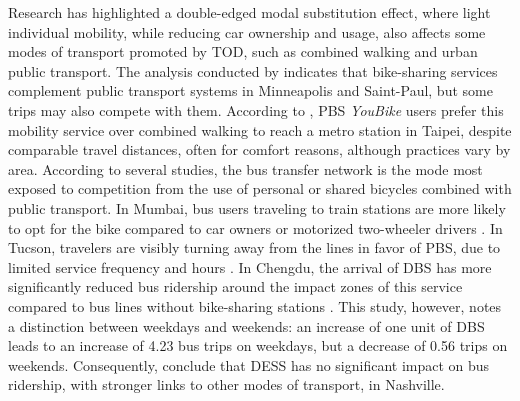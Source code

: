 \begin{refsegment}
Research has highlighted a double-edged modal substitution effect, where light individual mobility, while reducing car ownership and usage, also affects some modes of transport promoted by \acrshort{TOD}, such as combined walking and urban public transport. The analysis conducted by \textcolor{blue}{\textcite[10]{song_investigating_2020}} indicates that bike-sharing services complement public transport systems in Minneapolis and Saint-Paul, but some trips may also compete with them. According to \textcolor{blue}{\textcite[8]{yen_how_2023}}, \acrshort{PBS} \textsl{YouBike} users prefer this mobility service over combined walking to reach a metro station in Taipei, despite comparable travel distances, often for comfort reasons, although practices vary by area. According to several studies, the bus transfer network is the mode most exposed to competition from the use of personal or shared bicycles combined with public transport. In Mumbai, bus users traveling to train stations are more likely to opt for the bike compared to car owners or motorized two-wheeler drivers \textcolor{blue}{\autocite[6]{rastogi_willingness_2010}}. In Tucson, travelers are visibly turning away from the  lines in favor of \acrshort{PBS}, due to limited service frequency and hours \textcolor{blue}{\autocite[16]{li_investigating_2022}}. In Chengdu, the arrival of \acrshort{DBS} has more significantly reduced bus ridership around the impact zones of this service compared to bus lines without bike-sharing stations \textcolor{blue}{\autocite[107]{ma_impacts_2019}}. This study, however, notes a distinction between weekdays and weekends: an increase of one unit of \acrshort{DBS} leads to an increase of 4.23 bus trips on weekdays, but a decrease of 0.56 trips on weekends. Consequently, \textcolor{blue}{\textcite[11]{ziedan_complement_2021}} conclude that \acrshort{DESS} has no significant impact on bus ridership, with stronger links to other modes of transport, in Nashville.%


\end{refsegment}
